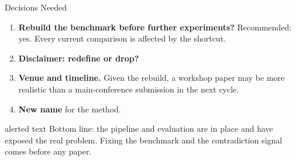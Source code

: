 \documentclass[aspectratio=169]{beamer}
\begin{document}
\begin{frame}{Decisions Needed}
  \begin{enumerate}
    \item \textbf{Rebuild the benchmark before further experiments?}
      Recommended: yes. Every current comparison is affected by the shortcut.
    \vspace{0.2cm}
    \item \textbf{Disclaimer: redefine or drop?}
    \vspace{0.2cm}
    \item \textbf{Venue and timeline.} Given the rebuild, a workshop paper may be more
      realistic than a main-conference submission in the next cycle.
    \vspace{0.2cm}
    \item \textbf{New name} for the method.
  \end{enumerate}
  \vspace{0.3cm}
  \begin{beamercolorbox}[sep=0.4em]{alerted text}
    \small Bottom line: the pipeline and evaluation are in place and have exposed the real
    problem. Fixing the benchmark and the contradiction signal comes before any paper.
  \end{beamercolorbox}
\end{frame}
\end{document}
